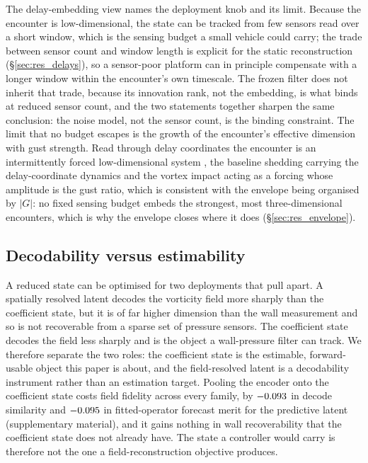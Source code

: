 The delay-embedding view names the deployment knob and its limit. Because the encounter is low-dimensional, the state can be tracked from few sensors read over a short window, which is the sensing budget a small vehicle could carry; the trade between sensor count and window length is explicit for the static reconstruction (\S\ref{sec:res_delays}), so a sensor-poor platform can in principle compensate with a longer window within the encounter's own timescale. The frozen filter does not inherit that trade, because its innovation rank, not the embedding, is what binds at reduced sensor count, and the two statements together sharpen the same conclusion: the noise model, not the sensor count, is the binding constraint. The limit that no budget escapes is the growth of the encounter's effective dimension with gust strength. Read through delay coordinates the encounter is an intermittently forced low-dimensional system \citep{brunton2017chaos}, the baseline shedding carrying the delay-coordinate dynamics and the vortex impact acting as a forcing whose amplitude is the gust ratio, which is consistent with the envelope being organised by $|G|$: no fixed sensing budget embeds the strongest, most three-dimensional encounters, which is why the envelope closes where it does (\S\ref{sec:res_envelope}).\re

\subsection{Decodability versus estimability}
\label{sec:disc_decode}

A reduced state can be optimised for two deployments that pull apart. A spatially resolved latent decodes the vorticity field more sharply than the coefficient state, but it is of far higher dimension than the wall measurement and so is not recoverable from a sparse set of pressure sensors. The coefficient state decodes the field less sharply and is the object a wall-pressure filter can track. We therefore separate the two roles: the coefficient state is the estimable, forward-usable object this paper is about, and the field-resolved latent is a decodability instrument rather than an estimation target. Pooling the encoder onto the coefficient state costs field fidelity across every family, by $-0.093$ in decode similarity and $-0.095$ in fitted-operator forecast merit for the predictive latent (supplementary material), and it gains nothing in wall recoverability that the coefficient state does not already have. The state a controller would carry is therefore not the one a field-reconstruction objective produces.\re

